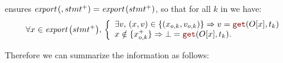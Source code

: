 \begin{skippableproof}
\begin{itemize}
\begin{itemize}
                         ensures
                        ${\textit{export}\left(, stmt^+\right)} = {\textit{export}\left(stmt^+\right)}$, so that for all $k$
                        in \N we have:
                        \begin{equation*}
                            \forall x \in \exportSet{stmt^+}, \,
                            \left\{\begin{array}{l}
                                \exists v, \, (x, v) \in \{(x_{o, k}, v_{o, k})\} \Rightarrow v = \getAt{O[x]}{t_k} \\
                                x \notin \{x_{o, k}^+\} \Rightarrow \bot = \getAt{O[x]}{t_k}.
                            \end{array}\right.
                        \end{equation*}

                        Therefore we can summarize the information as follows:


\end{itemize}
\end{itemize}
\end{skippableproof}
